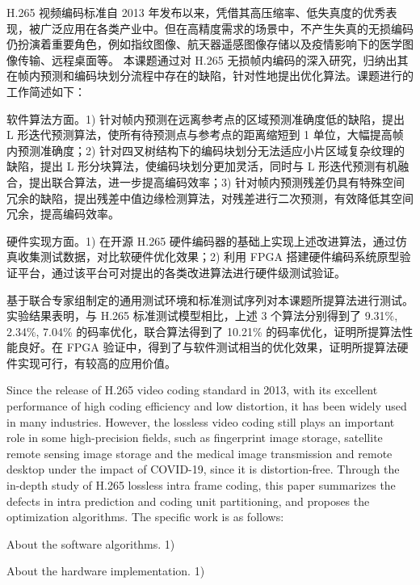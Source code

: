 \begin{cabstract}
    H.265 视频编码标准自 2013 年发布以来，凭借其高压缩率、低失真度的优秀表现，被广泛应用在各类产业中。但在高精度需求的场景中，不产生失真的无损编码仍扮演着重要角色，例如指纹图像、航天器遥感图像存储以及疫情影响下的医学图像传输、远程桌面等。    
    本课题通过对 H.265 无损帧内编码的深入研究，归纳出其在帧内预测和编码块划分流程中存在的缺陷，针对性地提出优化算法。课题进行的工作简述如下：

    软件算法方面。1) 针对帧内预测在远离参考点的区域预测准确度低的缺陷，提出 L 形迭代预测算法，使所有待预测点与参考点的距离缩短到 1 单位，大幅提高帧内预测准确度；2) 针对四叉树结构下的编码块划分无法适应小片区域复杂纹理的缺陷，提出 L 形分块算法，使编码块划分更加灵活，同时与 L 形迭代预测有机融合，提出联合算法，进一步提高编码效率；3) 针对帧内预测残差仍具有特殊空间冗余的缺陷，提出残差中值边缘检测算法，对残差进行二次预测，有效降低其空间冗余，提高编码效率。

    硬件实现方面。1) 在开源 H.265 硬件编码器的基础上实现上述改进算法，通过仿真收集测试数据，对比软硬件优化效果；2) 利用 FPGA 搭建硬件编码系统原型验证平台，通过该平台可对提出的各类改进算法进行硬件级测试验证。

    基于联合专家组制定的通用测试环境和标准测试序列对本课题所提算法进行测试。实验结果表明，与 H.265 标准测试模型相比，上述 3 个算法分别得到了 9.31\%, 2.34\%, 7.04\% 的码率优化，联合算法得到了 10.21\% 的码率优化，证明所提算法性能良好。在 FPGA 验证中，得到了与软件测试相当的优化效果，证明所提算法硬件实现可行，有较高的应用价值。
\end{cabstract}


\begin{eabstract}
    Since the release of H.265 video coding standard in 2013, with its excellent performance of high coding efficiency and low distortion, it has been widely used in many industries. However, the lossless video coding still plays an important role in some high-precision fields, such as fingerprint image storage, satellite remote sensing image storage and the medical image transmission and remote desktop under the impact of COVID-19, since it is distortion-free. Through the in-depth study of H.265 lossless intra frame coding, this paper summarizes the defects in intra prediction and coding unit partitioning, and proposes the optimization algorithms. The specific work is as follows:

    About the software algorithms. 1)

    About the hardware implementation. 1) 

\end{eabstract}

